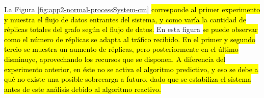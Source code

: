 %
%
%
%
%


La Figura \ref{fig:app2-normal-processSystem-cm} \hl{corresponde al primer experimento y muestra el flujo de datos entrantes del sistema, y como varía la cantidad de réplicas totales del grafo según el flujo de datos.} En esta figura \hl{se puede observar como el número de réplicas se adapta al tráfico recibido. En el primer y segundo tercio se muestra un aumento de réplicas, pero posteriormente en el último disminuye, aprovechando los recursos que se disponen. A diferencia del experimento anterior, en éste no se activa el algoritmo predictivo, y eso se debe a qué no existe una posible sobrecarga a futuro, dado que se estabiliza el sistema antes de este análisis debido al algoritmo reactivo.}

